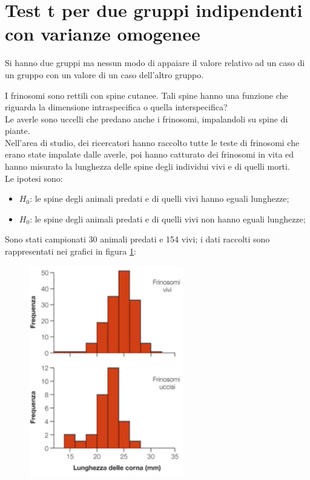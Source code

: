 \documentclass[10pt, draft]{book}
\newcounter{example}[section]
\begin{document}
\section{Test \texorpdfstring{t}{Lg} per due gruppi indipendenti con varianze omogenee}
Si hanno due gruppi ma nessun modo di appaiare il valore relativo ad un caso di un gruppo con un valore di un caso dell'altro gruppo.
\begin{example}\label{esfrinosomi}
    I frinosomi sono rettili con spine cutanee. Tali spine hanno una funzione che riguarda la dimensione intraspecifica o quella interspecifica?
    \\
    Le averle sono uccelli che predano anche i frinosomi, impalandoli su spine di piante.
    \\
    Nell'area di studio, dei ricercatori hanno raccolto tutte le teste di frinosomi che erano state impalate dalle averle, poi hanno catturato dei frinosomi in vita ed hanno misurato la lunghezza delle spine degli individui vivi e di quelli morti.
    \\
    Le ipotesi sono:
    \begin{itemize}
        \item $H_0$: le spine degli animali predati e di quelli vivi hanno eguali lunghezze;
        \item $H_0$: le spine degli animali predati e di quelli vivi non hanno eguali lunghezze;
    \end{itemize}
    Sono stati campionati 30 animali predati e 154 vivi; i dati raccolti sono rappresentati nei grafici in figura \ref{fig12.3-1}:
    \begin{figure}[H]\label{fig12.3-1}
        \centering
        \includegraphics[width=0.6\textwidth]{fig12.3-1}

\end{figure}
\end{example}
\end{document}
